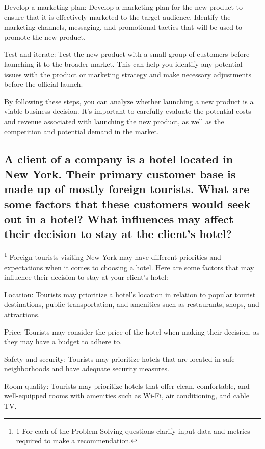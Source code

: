 \documentclass[12pt, a4paper, oneside]{article}
\begin{document}
Develop a marketing plan: Develop a marketing plan for the new product to ensure that it is effectively marketed to the target audience. Identify the marketing channels, messaging, and promotional tactics that will be used to promote the new product.

Test and iterate: Test the new product with a small group of customers before launching it to the broader market. This can help you identify any potential issues with the product or marketing strategy and make necessary adjustments before the official launch.

By following these steps, you can analyze whether launching a new product is a viable business decision. It's important to carefully evaluate the potential costs and revenue associated with launching the new product, as well as the competition and potential demand in the market.




\subsection{ A client of a company is a hotel located in New York. Their primary customer base is made up of mostly foreign tourists. What are some factors that these customers would seek out in a hotel? What influences may affect their decision to stay at the client's hotel?  }



 \footnote{ 1 For each of the Problem Solving questions clarify input data and metrics required to make a recommendation.} 
 Foreign tourists visiting New York may have different priorities and expectations when it comes to choosing a hotel. Here are some factors that may influence their decision to stay at your client's hotel:

Location: Tourists may prioritize a hotel's location in relation to popular tourist destinations, public transportation, and amenities such as restaurants, shops, and attractions.

Price: Tourists may consider the price of the hotel when making their decision, as they may have a budget to adhere to.

Safety and security: Tourists may prioritize hotels that are located in safe neighborhoods and have adequate security measures.

Room quality: Tourists may prioritize hotels that offer clean, comfortable, and well-equipped rooms with amenities such as Wi-Fi, air conditioning, and cable TV.
\end{document}
